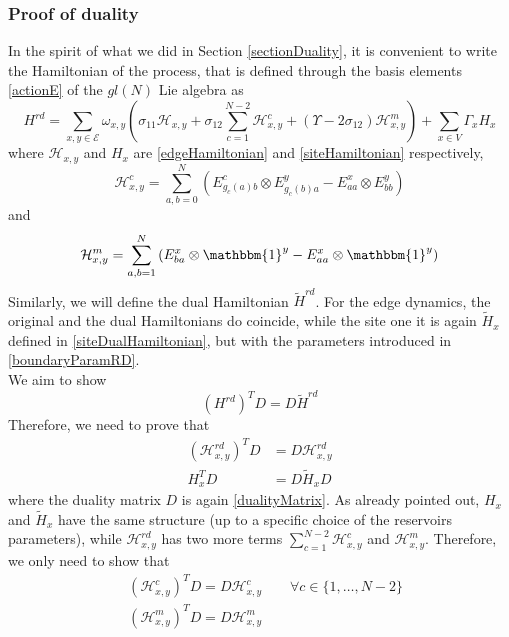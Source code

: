 \documentclass[11pt]{article}
\numberwithin{equation}{section}
\numberwithin{equation}{subsection}
\begin{document}
\subsubsection{Proof of duality}
In the spirit of what we did in Section \ref{sectionDuality}, it is convenient to write the Hamiltonian of the process, that is defined through the basis elements \eqref{actionE} of the $gl(N)$ Lie algebra as 
\begin{equation}
	H^{rd}=\sum_{x,y\in \mathcal{E}}\omega_{x,y}\left(\sigma_{11}\mathcal{H}_{x,y}+\sigma_{12}\sum_{c=1}^{N-2}\mathcal{H}_{x,y}^{c}+(\Upsilon-2\sigma_{12})\mathcal{H}_{x,y}^{m}\right)+\sum_{x\in V}\Gamma_{x}H_{x}
\end{equation}
where $\mathcal{H}_{x,y}$ and $H_{x}$ are \eqref{edgeHamiltonian} and \eqref{siteHamiltonian} respectively, 
\begin{equation}
	\mathcal{H}_{x,y}^{c}=\sum_{a,b=0}^{N}\left(E_{g_{c}(a)b}^{c}\otimes E_{g_{c}(b)a}^{y}-E_{aa}^{x}\otimes E_{bb}^{y}\right)
\end{equation}
and 
\begin{equation}
	\mathcal{H}_{x,y}^{m}=\sum_{a,b=1}^{N}\left(E_{ba}^{x}\otimes \mathbbm{1}^{y}-E_{aa}^{x}\otimes \mathbbm{1}^{y}\right)
\end{equation}
Similarly, we will define the dual Hamiltonian $\widetilde{H}^{rd}$. For the edge dynamics, the original and the dual Hamiltonians do coincide, while the site one it is again $\widetilde{H}_{x}$ defined in \eqref{siteDualHamiltonian}, but with the parameters introduced in \eqref{boundaryParamRD}.\\ We aim to show
\begin{equation}\label{DualityRelationRD}
	(H^{rd})^{T}D=D\widetilde{H}^{rd}
\end{equation}
Therefore, we need to prove that
\begin{align}
	(\mathcal{H}_{x,y}^{rd})^{T}D&=D\mathcal{H}_{x,y}^{rd}\label{edgeDualityRelationRD}\\
	H_{x}^{T}D&=D\widetilde{H}_{x}D\label{siteDualityRelationRD}
\end{align}
where the duality matrix $D$ is again \eqref{dualityMatrix}. As already pointed out, $H_{x}$ and $\widetilde{H}_{x}$ have the same structure (up to a specific choice of the reservoirs parameters), while $\mathcal{H}_{x,y}^{rd}$ has two more terms $\sum_{c=1}^{N-2}\mathcal{H}_{x,y}^{c}$ and $\mathcal{H}_{x,y}^{m}$. Therefore, we only need to show that 
\begin{align}
	&(\mathcal{H}_{x,y}^{c})^{T}D=D\mathcal{H}_{x,y}^{c}\qquad \forall c\in \{1,\ldots,N-2\}\label{cDualityRelation}\\
	&(\mathcal{H}_{x,y}^{m})^{T}D=D\mathcal{H}_{x,y}^{m}\label{mDualityRelation}
\end{align}
\end{document}
